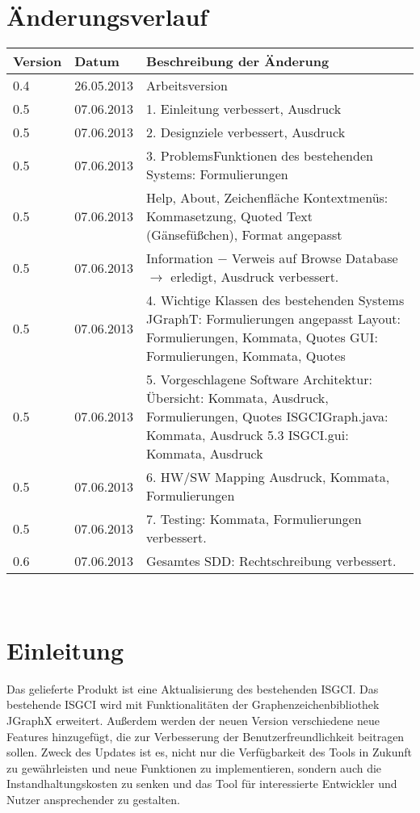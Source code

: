 \documentclass[10pt,a4paper]{article}
\begin{document}
\section{Änderungsverlauf}
\hspace*{-1cm}
\begin{tabular}{|l|l|p{10.5cm}|}\hline
 \textbf{Version}&\textbf{Datum}&\textbf{Beschreibung der \"Anderung}\\\hline
 0.4&26.05.2013&Arbeitsversion\\\hline
 0.5& 07.06.2013 & 1. Einleitung verbessert, Ausdruck\\\hline
 0.5& 07.06.2013 & 2. Designziele verbessert, Ausdruck\\\hline
 0.5& 07.06.2013 & 3. ProblemsFunktionen des bestehenden Systems: Formulierungen\\\hline
 0.5& 07.06.2013 & Help, About, Zeichenfläche Kontextmenüs: Kommasetzung, Quoted Text (Gänsefüßchen), Format angepasst\\\hline
 0.5& 07.06.2013 & Information $-$ Verweis auf Browse Database $\rightarrow$ erledigt, \newline
 			      Ausdruck verbessert.\\\hline
 0.5& 07.06.2013 & 4. {Wichtige Klassen des bestehenden Systems}\newline
 				  JGraphT: Formulierungen angepasst\newline
 				  Layout: Formulierungen, Kommata, Quotes      \newline 
 				  GUI: Formulierungen, Kommata, Quotes\\\hline 
 0.5& 07.06.2013 & 5. Vorgeschlagene Software Architektur: \newline
 				  5.1 Übersicht: Kommata, Ausdruck, Formulierungen, Quotes\newline
 				  5.2 ISGCIGraph.java: Kommata, Ausdruck
 				  5.3 ISGCI.gui: Kommata, Ausdruck\\\hline
 0.5& 07.06.2013 & 6. HW/SW Mapping \newline
 					Ausdruck, Kommata, Formulierungen\\\hline
 0.5& 07.06.2013 & 7. Testing: Kommata, Formulierungen verbessert.\\\hline
 0.6& 07.06.2013 & Gesamtes SDD: Rechtschreibung verbessert.\\\hline
 
\end{tabular}\\
\section{Einleitung}
Das gelieferte Produkt ist eine Aktualisierung des bestehenden ISGCI. Das bestehende ISGCI wird mit Funktionalitäten der Graphenzeichenbibliothek JGraphX erweitert. Außerdem werden der neuen Version verschiedene neue Features hinzugefügt, die zur Verbesserung der Benutzerfreundlichkeit beitragen sollen. Zweck des Updates ist es, nicht nur die Verfügbarkeit des Tools in Zukunft zu gewährleisten und neue Funktionen zu implementieren, sondern auch die Instandhaltungskosten zu senken und das Tool für interessierte Entwickler und Nutzer ansprechender zu gestalten.
\end{document}

